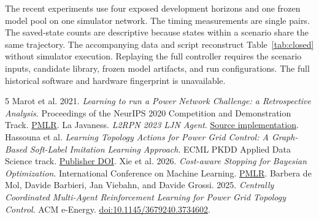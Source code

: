 \documentclass[sigconf,review,anonymous]{acmart}
\begin{document}
The recent experiments use four exposed development horizons and one frozen model pool on one simulator network. The timing measurements are single pairs. The saved-state counts are descriptive because states within a scenario share the same trajectory. The accompanying data and script reconstruct Table~\ref{tab:closed} without simulator execution. Replaying the full controller requires the scenario inputs, candidate library, frozen model artifacts, and run configurations. The full historical software and hardware fingerprint is unavailable.

\begin{thebibliography}{5}
Marot et al. 2021. \emph{Learning to run a Power Network Challenge: a Retrospective Analysis}. Proceedings of the NeurIPS 2020 Competition and Demonstration Track. \href{https://proceedings.mlr.press/v133/marot21a.html}{PMLR}.
La Javaness. \emph{L2RPN 2023 LJN Agent}. \href{https://github.com/lajavaness/l2rpn-2023-ljn-agent}{Source implementation}.
Hassouna et al. \emph{Learning Topology Actions for Power Grid Control: A Graph-Based Soft-Label Imitation Learning Approach}. ECML PKDD Applied Data Science track. \href{https://doi.org/10.1007/978-3-032-06129-4_8}{Publisher DOI}.
Xie et al. 2026. \emph{Cost-aware Stopping for Bayesian Optimization}. International Conference on Machine Learning. \href{https://proceedings.mlr.press/v306/xie26c.html}{PMLR}.
Barbera de Mol, Davide Barbieri, Jan Viebahn, and Davide Grossi. 2025. \emph{Centrally Coordinated Multi-Agent Reinforcement Learning for Power Grid Topology Control}. ACM e-Energy. \href{https://doi.org/10.1145/3679240.3734602}{doi:10.1145/3679240.3734602}.
\end{thebibliography}
\end{document}
